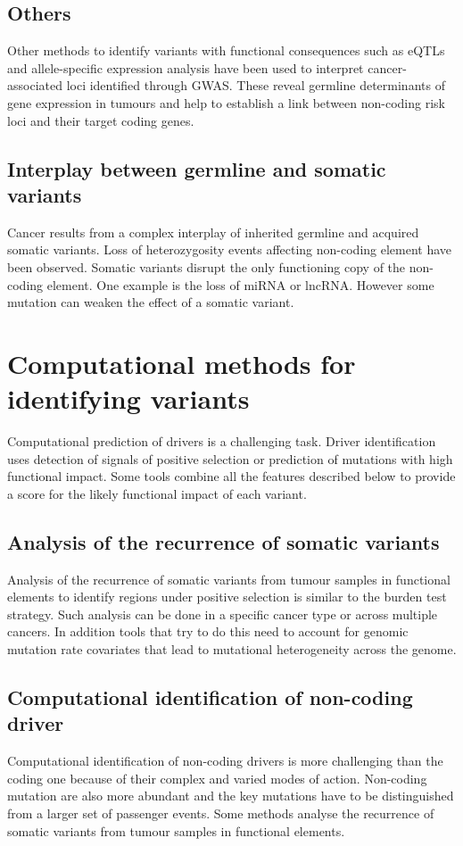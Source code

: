 	\subsection{Others}
	Other methods to identify variants with functional consequences such as eQTLs and allele-specific expression analysis have been used to interpret cancer-associated loci identified through GWAS.
	These reveal germline determinants of gene expression in tumours and help to establish a link between non-coding risk loci and their target coding genes.

	\subsection{Interplay between germline and somatic variants}
	Cancer results from a complex interplay of inherited germline and acquired somatic variants.
	Loss of heterozygosity events affecting non-coding element have been observed.
	Somatic variants disrupt the only functioning copy of the non-coding element.
	One example is the loss of miRNA or lncRNA.
	However some mutation can weaken the effect of a somatic variant.

\section{Computational methods for identifying variants}
Computational prediction of drivers is a challenging task.
Driver identification uses detection of signals of positive selection or prediction of mutations with high functional impact.
Some tools combine all the features described below to provide a score for the likely functional impact of each variant.

	\subsection{Analysis of the recurrence of somatic variants}
	Analysis of the recurrence of somatic variants from tumour samples in functional elements to identify regions under positive selection is similar to the burden test strategy.
	Such analysis can be done in a specific cancer type or across multiple cancers.
	In addition tools that try to do this need to account for genomic mutation rate covariates that lead to mutational heterogeneity across the genome.

	\subsection{Computational identification of non-coding driver}
	Computational identification of non-coding drivers is more challenging than the coding one because of their complex and varied modes of action.
	Non-coding mutation are also more abundant and the key mutations have to be distinguished from a larger set of passenger events.
	Some methods analyse the recurrence of somatic variants from tumour samples in functional elements.


